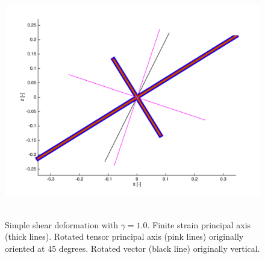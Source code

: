 \documentclass[12pt,english,openany]{scrbook}
\begin{document}
\begin{figure}[ht!]
\centerline{\includegraphics[height=4.0in]{./Figures/FiniteStrainRotation}}
\caption{Simple shear deformation with $\gamma = 1.0$. Finite strain principal axis (thick lines). Rotated tensor principal axis (pink lines) originally oriented at 45 degrees. Rotated vector (black line) originally vertical.}
\label{FiniteStrainRotation}
\end{figure}


 
\end{document}

